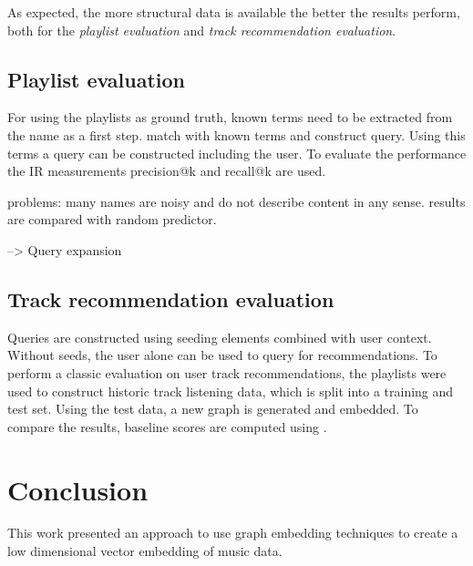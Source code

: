 \documentclass[a4paper]{llncs}
\begin{document}
	
	
	As expected, the more structural data is available the better the results perform, both for the \emph{playlist evaluation} and \emph{track recommendation evaluation}.
	
	\subsection{Playlist evaluation}
	\label{subsec:playlist_eval}
	For using the playlists as ground truth, known terms need to be extracted from the name as a first step. match with known terms and construct query. Using this terms a query can be constructed including the user. To evaluate the performance the IR measurements precision@k and recall@k are used.
	
	
	problems: many names are noisy and do not describe content in any sense. results are compared with random predictor.
	
	--> Query expansion
	
	
	
	
	\subsection{Track recommendation evaluation}
	\label{subsec:track_rec_eval}
	Queries are constructed using seeding elements combined with user context. Without seeds, the user alone can be used to query for recommendations. To perform a classic evaluation on user track recommendations, the playlists were used to construct historic track listening data, which is split into a training and test set. Using the test data, a new graph is generated and embedded. To compare the results, baseline scores are computed using \cite{Gantner2011MyMediaLite}.
	
	
	
	
	
	\section{Conclusion}
	This work presented an approach to use graph embedding techniques to create a low dimensional vector embedding of music data.
	
	
	
	
	
	
\end{document}
